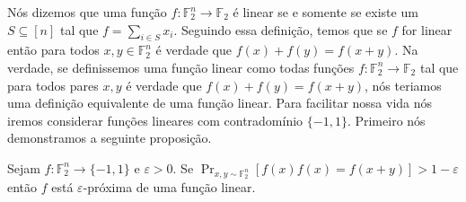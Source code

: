 Nós dizemos que uma função $f: \mathbb{F}_{2}^{n} \to \mathbb{F}_{2}$ é linear se e somente se existe um $S \subseteq [n]$ tal que $f = \sum_{i \in S}x_{i}$. Seguindo essa definição, temos que se $f$ for linear então para todos $x, y \in \mathbb{F}_{2}^{n}$ é verdade que $f(x) + f(y) = f(x + y)$. Na verdade, se definissemos uma função linear como todas funções $f: \mathbb{F}_{2}^{n} \to \mathbb{F}_{2}$ tal que para todos pares $x, y$ é verdade que $f(x) + f(y) = f(x + y)$, nós teriamos uma definição equivalente de uma função linear. Para facilitar nossa vida nós iremos considerar funções lineares com contradomínio $\{-1, 1\}$. Primeiro nós demonstramos a seguinte proposição.

\begin{prop} \label{linear_prox}

Sejam $f: \mathbb{F}_{2}^{n} \to \{-1, 1\}$ e $\varepsilon > 0$. Se $\Pr_{x, y \sim \mathbb{F}_{2}^{n}}[f(x)f(x) = f(x + y)] > 1- \varepsilon$ então $f$ está $\varepsilon$-próxima de uma função linear.

\end{prop}

